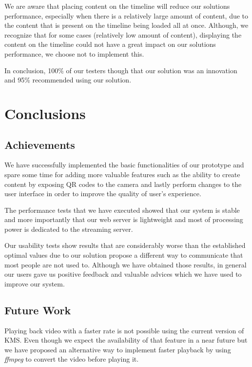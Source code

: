 \documentclass[10pt,conference]{IEEEtran}
\begin{document}
We are aware that placing content on the timeline will reduce our solutions performance, especially when there is a relatively large amount of content, due to the content that is present on the timeline being loaded all at once. Although, we recognize that for some cases (relatively low amount of content), displaying the content on the timeline could not have a great impact on our solutions performance, we choose not to implement this.

In conclusion, 100\% of our testers though that our solution was an innovation and 95\% recommended using our solution.
















\section{Conclusions}
\label{chapter:conclusion}
\subsection{Achievements}
\label{section:achievements}

	We have successfully implemented the basic functionalities of our prototype and spare some time for adding more valuable features such as the ability to create content by exposing \gls{QR} codes to the camera and lastly perform changes to the user interface in order to improve the quality of user's experience.

	The performance tests that we have executed showed that our system is stable and more importantly that our web server is lightweight and most of processing power is dedicated to the streaming server.

	Our usability tests show results that are considerably worse than the established optimal values due to our solution propose a different way to communicate that most people are not used to. Although we have obtained those results, in general our users gave us positive feedback and valuable advices which we have used to improve our system. 

\subsection{Future Work}
\label{section:future}
	Playing back video with a faster rate is not possible using the current version of \gls{KMS}. Even though we expect the availability of that feature in a near future but we have proposed an alternative way to implement faster playback by using \emph{ffmpeg} to convert the video before playing it.
\end{document}

